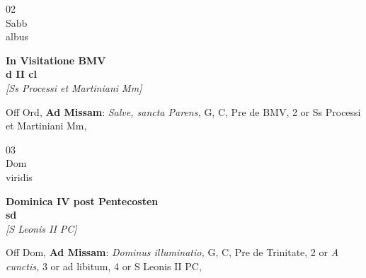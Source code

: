 \documentclass[10pt, openany]{book}
\begin{document}
        \begin{center}
            \begin{minipage}{3.5in}
                \vspace{2em}
                \begin{minipage}{0.5in}
                    {\Huge 02} \\
                    {\normalsize Sabb} \\
                    {\normalsize albus}
                \end{minipage}
                \begin{minipage}{3.0in}
                    \textbf{ \large In Visitatione BMV \\
                    \textnormal{\normalsize d II cl}} \\ \textit{[Ss Processi et Martiniani Mm]} \\ 
                \end{minipage}
                \begin{justify}Off Ord, \textbf{Ad Missam}: \textit{Salve, sancta Parens,} G, C, Pre de BMV, 2 or Ss Processi et Martiniani Mm,  
                \end{justify}
            \end{minipage}
        \end{center}
    
        \begin{center}
            \begin{minipage}{3.5in}
                \vspace{2em}
                \begin{minipage}{0.5in}
                    {\Huge 03} \\
                    {\normalsize Dom} \\
                    {\normalsize viridis}
                \end{minipage}
                \begin{minipage}{3.0in}
                    \textbf{ \large Dominica IV post Pentecosten \\
                    \textnormal{\normalsize sd}} \\ \textit{[S Leonis II PC]} \\ 
                \end{minipage}
                \begin{justify}Off Dom, \textbf{Ad Missam}: \textit{Dominus illuminatio,} G, C, Pre de Trinitate, 2 or \textit{A cunctis,} 3 or ad libitum, 4 or S Leonis II PC,  
                \end{justify}
            \end{minipage}
        \end{center}
    
\end{document}

